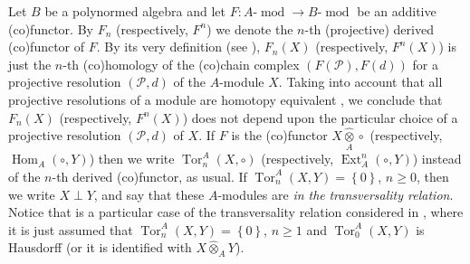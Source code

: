 \documentclass[12pt,reqno]{amsart}%
\theoremstyle{plain}
\numberwithin{theorem}{section} \numberwithin{equation}{section}
\numberwithin{lemma}{section}
\numberwithin{remark}{section}
\numberwithin{example}{section}
\numberwithin{proposition}{section}
\numberwithin{definition}{section}
\numberwithin{corollary}{section}
\begin{document}
Let $B$ be a polynormed algebra and let $F:A$-$\operatorname*{mod}\rightarrow
B$-$\operatorname*{mod}$ be an additive (co)functor. By $F_{n}$ (respectively,
$F^{n}$) we denote the $n$-th (projective) derived (co)functor of $F$. By its
very definition (see \cite[3.3.1]{Hel}), $F_{n}\left(  X\right)  $
(respectively, $F^{n}\left(  X\right)  $) is just the $n$-th (co)homology of
the (co)chain complex $\left(  F\left(  \mathcal{P}\right)  ,F\left(
d\right)  \right)  $ for a projective resolution $\left(  \mathcal{P}%
,d\right)  $ of the $A$-module $X$. Taking into account that all projective
resolutions of a module are homotopy equivalent \cite[3.2.3]{Hel}, we conclude
that $F_{n}\left(  X\right)  $ (respectively, $F^{n}\left(  X\right)  $) does
not depend upon the particular choice of a projective resolution $\left(
\mathcal{P},d\right)  $ of $X$. If $F$ is the (co)functor
$X\underset{A}{\widehat{\otimes}}\circ$ (respectively, $\operatorname{Hom}%
_{A}\left(  \circ\mathfrak{,}Y\right)  $) then we write $\operatorname{Tor}%
_{n}^{A}\left(  X,\circ\right)  $ (respectively, $\operatorname{Ext}_{A}%
^{n}\left(  \circ,Y\right)  $) instead of the $n$-th derived (co)functor, as
usual. If $\operatorname{Tor}_{n}^{A}\left(  X,Y\right)  =\left\{  0\right\}
$, $n\geq0$, then we write $X\perp Y$, and say that these $A$-modules are
\textit{in the} \textit{transversality relation}. Notice that is a particular
case of the transversality relation considered in \cite[Definition 3.1.14]%
{EP}, where it is just assumed that $\operatorname{Tor}_{n}^{A}\left(
X,Y\right)  =\left\{  0\right\}  $, $n\geq1$ and $\operatorname{Tor}_{0}%
^{A}\left(  X,Y\right)  $ is Hausdorff (or it is identified with
$X\widehat{\otimes}_{A}Y$).
\end{document}
